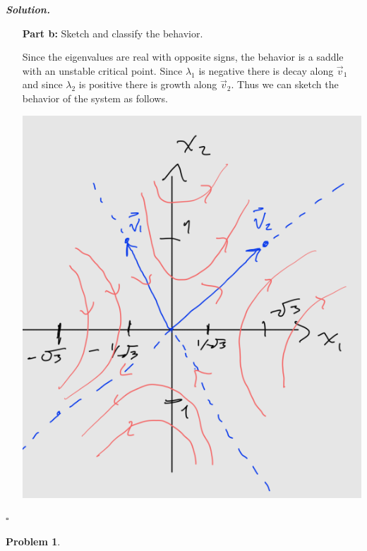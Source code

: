 \documentclass[12pt]{report}
\newtheorem{problem}{Problem}
\newenvironment{solution}[1][\it{Solution}]{\textbf{#1. } }{$\square$}
\begin{document}
\begin{solution}
\begin{enumerate}
        
        
        
        \item [{\bf Part b:}] Sketch and classify the behavior.
        
        \noindent
        Since the eigenvalues are real with opposite signs, the behavior is a saddle with an unstable critical point. Since $\lambda_1$ is negative there is decay along $\vec{v}_1$ and since $\lambda_2$ is positive there is growth along $\vec{v}_2$. Thus we can sketch the behavior of the system as follows.


        \begin{center}
            \includegraphics[width=.6\linewidth]{images/6.PNG}
        \end{center}
    \end{enumerate}
\end{solution}
\newpage



\begin{problem}
    
\end{problem}
\end{document}
